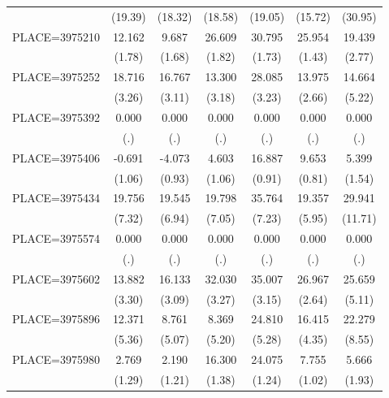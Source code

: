 {\begin{tabular}{l*{6}{c}}
                    &     (19.39)&     (18.32)&     (18.58)&     (19.05)&     (15.72)&     (30.95)\\
PLACE=3975210       &      12.162&       9.687&      26.609&      30.795&      25.954&      19.439\\
                    &      (1.78)&      (1.68)&      (1.82)&      (1.73)&      (1.43)&      (2.77)\\
PLACE=3975252       &      18.716&      16.767&      13.300&      28.085&      13.975&      14.664\\
                    &      (3.26)&      (3.11)&      (3.18)&      (3.23)&      (2.66)&      (5.22)\\
PLACE=3975392       &       0.000&       0.000&       0.000&       0.000&       0.000&       0.000\\
                    &         (.)&         (.)&         (.)&         (.)&         (.)&         (.)\\
PLACE=3975406       &      -0.691&      -4.073&       4.603&      16.887&       9.653&       5.399\\
                    &      (1.06)&      (0.93)&      (1.06)&      (0.91)&      (0.81)&      (1.54)\\
PLACE=3975434       &      19.756&      19.545&      19.798&      35.764&      19.357&      29.941\\
                    &      (7.32)&      (6.94)&      (7.05)&      (7.23)&      (5.95)&     (11.71)\\
PLACE=3975574       &       0.000&       0.000&       0.000&       0.000&       0.000&       0.000\\
                    &         (.)&         (.)&         (.)&         (.)&         (.)&         (.)\\
PLACE=3975602       &      13.882&      16.133&      32.030&      35.007&      26.967&      25.659\\
                    &      (3.30)&      (3.09)&      (3.27)&      (3.15)&      (2.64)&      (5.11)\\
PLACE=3975896       &      12.371&       8.761&       8.369&      24.810&      16.415&      22.279\\
                    &      (5.36)&      (5.07)&      (5.20)&      (5.28)&      (4.35)&      (8.55)\\
PLACE=3975980       &       2.769&       2.190&      16.300&      24.075&       7.755&       5.666\\
                    &      (1.29)&      (1.21)&      (1.38)&      (1.24)&      (1.02)&      (1.93)\\

\end{tabular}}
